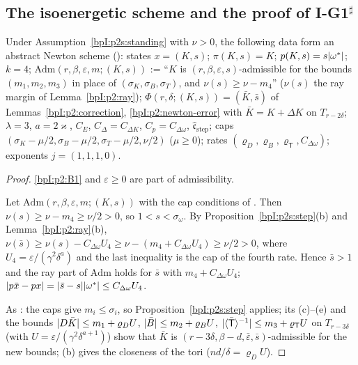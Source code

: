 \subsection{The isoenergetic scheme and the proof of I-G1$^\sharp$}\label{bpI:p2s:sec-proof}

\begin{lemma}\label{bpI:p2s:scheme}
Under Assumption~\ref{bpI:p2s:standing} with $\nu>0$, the following data form an abstract Newton scheme ():
states $x=(K,s)$; $\pi(K,s)=K$; $p(K,s)=s\lvert \omega^*\rvert$; $k=4$; $\mathrm{Adm}(r,\beta,\varepsilon,m;(K,s))$ := ``$K$ is $(r,\beta,\varepsilon,s)$-admissible for
the bounds $(m_1,m_2,m_3)$ in place of $(\sigma_K,\sigma_B,\sigma_T)$, and $\nu(s)\ge\nu-m_4$'' ($\nu(s)$ the ray margin of
Lemma~\ref{bpI:p2:ray}); $\Phi(r,\delta;(K,s))=(\bar K,\bar s)$ of Lemmas~\ref{bpI:p2:correction}, \ref{bpI:p2:newton-error} with
$\bar K=K+\Delta K$ on $T_{r-2\delta}$; $\lambda=3$, $a=2\varkappa$, $C_E$, $C_\Delta=C_{\Delta K}$, $C_p=C_{\Delta\omega}$, $\hat{\mathfrak c}_{\mathrm{step}}$;
caps $(\sigma_K-\mu/2,\sigma_B-\mu/2,\sigma_T-\mu/2,\nu/2)$ ($\mu\ge0$); rates $(\varrho_D,\varrho_B,\varrho_{\mathsf T},C_{\Delta\omega})$; exponents $j=(1,1,1,0)$.
\end{lemma}

\begin{proof}
\label{stepI:p2s:sc-n1}
\ref{bpI:p2:B1} and $\varepsilon\ge0$ are part of admissibility.

\label{stepI:p2s:sc-s}
Let $\mathrm{Adm}(r,\beta,\varepsilon,m;(K,s))$ with the cap conditions of . Then $\nu(s)\ge\nu-m_4\ge\nu/2>0$, so $1<s<\sigma_\omega$. By
Proposition~\ref{bpI:p2s:step}(b) and Lemma~\ref{bpI:p2:ray}(b), $\nu(\bar s)\ge\nu(s)-C_{\Delta\omega}U_4\ge\nu-(m_4+C_{\Delta\omega}U_4)\ge\nu/2>0$, where
$U_4=\varepsilon/(\gamma^2\delta^a)$ and the last inequality is the cap of the fourth rate. Hence $\bar s>1$ and the ray part of $\mathrm{Adm}$ holds
for $\bar s$ with $m_4+C_{\Delta\omega}U_4$; $\lvert p\bar x-px\rvert=\lvert \bar s-s\rvert\lvert \omega^*\rvert\le C_{\Delta\omega}U_4$.

\label{stepI:p2s:sc-n2}
As : the caps give $m_i\le\sigma_i$, so Proposition~\ref{bpI:p2s:step} applies; its (c)--(e) and the bounds $\lvert D\bar K\rvert\le
m_1+\varrho_DU$, $\lvert \bar B\rvert\le m_2+\varrho_BU$, $\lvert \langle \bar{\mathsf T}\rangle^{-1}\rvert\le m_3+\varrho_{\mathsf T}U$ on $T_{r-3\delta}$ (with $U=\varepsilon/(\gamma^2\delta^{a+1})$) show
that $\bar K$ is $(r-3\delta,\beta-d,\bar\varepsilon,\bar s)$-admissible for the new bounds; (b) gives the closeness of the tori ($nd/\delta=\varrho_DU$).
\end{proof}


